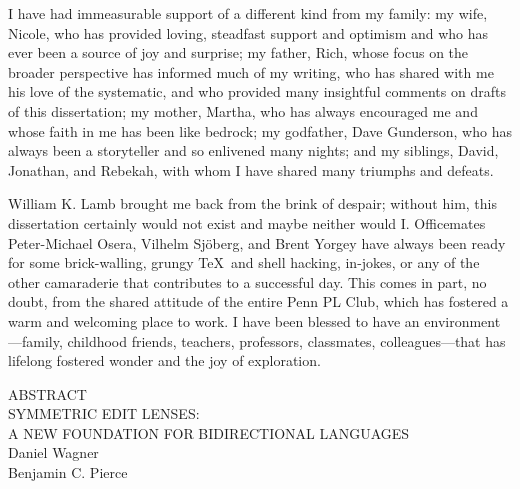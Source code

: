 \documentclass[12pt]{report}
\numberwithin{equation}{section}
\def\thetitle{\uppercase{Symmetric Edit Lenses:\\A New Foundation For Bidirectional Languages}}
\def\theauthor{Daniel Wagner}
\def\theadvisor{Benjamin C. Pierce}
\begin{document}
I have had immeasurable support of a different kind from my family: my wife,
Nicole, who has provided loving, steadfast support and optimism and who has
ever been a source of joy and surprise; my father, Rich, whose focus on the
broader perspective has informed much of my writing, who has shared with me
his love of the systematic, and who provided many insightful comments on
drafts of this dissertation; my mother, Martha, who has always encouraged me
and whose faith in me has been like bedrock; my godfather, Dave Gunderson,
who has always been a storyteller and so enlivened many nights; and my
siblings, David, Jonathan, and Rebekah, with whom I have shared many
triumphs and defeats.

William K. Lamb brought me back from the brink of despair; without him, this
dissertation certainly would not exist and maybe neither would I.
Officemates Peter-Michael Osera, Vilhelm Sj\"oberg, and Brent Yorgey have
always been ready for some brick-walling, grungy \TeX\ and shell hacking,
in-jokes, or any of the other camaraderie that contributes to a successful
day. This comes in part, no doubt, from the shared attitude of the entire
Penn PL Club, which has fostered a warm and welcoming place to work. I have
been blessed to have an environment---family, childhood friends, teachers,
professors, classmates, colleagues---that has lifelong fostered wonder and
the joy of exploration.


\newpage
\doublespacing

\begin{center}
  ABSTRACT\\
  \thetitle\\
  \theauthor\\
  \theadvisor
\end{center}
\end{document}
